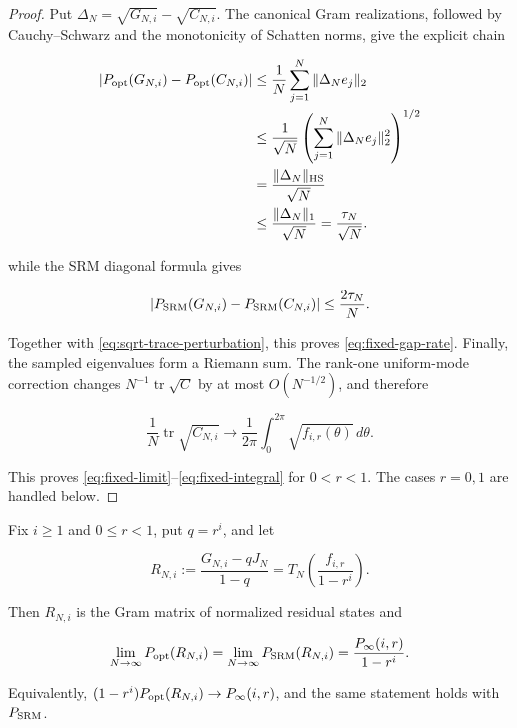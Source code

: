 \begin{proof}
Put \(\Delta_N=\sqrt{G_{N,i}}-\sqrt{C_{N,i}}\). The canonical Gram realizations, followed by Cauchy--Schwarz and the monotonicity of Schatten norms, give the explicit chain

\begin{align}\label{eq:opt-circulant-transfer}
|P_{\rm opt}(G_{N,i})-P_{\rm opt}(C_{N,i})|
&\le\frac1N\sum_{j=1}^N\|\Delta_Ne_j\|_2 \notag\\
&\le\frac1{\sqrt N}
\left(\sum_{j=1}^N\|\Delta_Ne_j\|_2^2\right)^{1/2} \notag\\
&=\frac{\|\Delta_N\|_{\rm HS}}{\sqrt N}
\notag\\
&\le\frac{\|\Delta_N\|_1}{\sqrt N}
=\frac{\tau_N}{\sqrt N}.
\end{align}

while the SRM diagonal formula gives

\[
|P_{\rm SRM}(G_{N,i})-P_{\rm SRM}(C_{N,i})|
\le\frac{2\tau_N}{N}.
\]

Together with \eqref{eq:sqrt-trace-perturbation}, this proves \eqref{eq:fixed-gap-rate}. Finally, the sampled eigenvalues form a Riemann sum. The rank-one uniform-mode correction changes \(N^{-1}\operatorname{tr}\sqrt C\) by at most \(O(N^{-1/2})\), and therefore

\[
\frac1N\operatorname{tr}\sqrt{C_{N,i}}
\longrightarrow
\frac1{2\pi}\int_0^{2\pi}\sqrt{f_{i,r}(\theta)}\,d\theta.
\]

This proves \eqref{eq:fixed-limit}--\eqref{eq:fixed-integral} for \(0<r<1\). The cases \(r=0,1\) are handled below.
\end{proof}

\begin{corollary}\label{cor:residual-toeplitz}
Fix \(i\ge1\) and \(0\le r<1\), put \(q=r^i\), and let

\[
R_{N,i}:=\frac{G_{N,i}-qJ_N}{1-q}
=T_N\!\left(\frac{f_{i,r}}{1-r^i}\right).
\]

Then \(R_{N,i}\) is the Gram matrix of normalized residual states and

\begin{equation}\label{eq:residual-toeplitz-limit}
\lim_{N\to\infty}P_{\rm opt}(R_{N,i})
=\lim_{N\to\infty}P_{\rm SRM}(R_{N,i})
=\frac{P_\infty(i,r)}{1-r^i}.
\end{equation}

Equivalently,
\((1-r^i)P_{\rm opt}(R_{N,i})\to P_\infty(i,r)\), and the same statement
holds with \(P_{\rm SRM}\).
\end{corollary}

